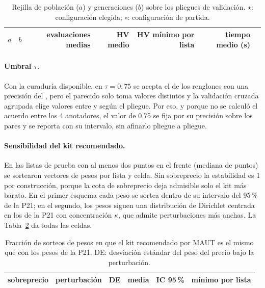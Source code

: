 \begin{table}[htbp]
\centering
\caption{Rejilla de población ($a$) y generaciones ($b$) sobre los pliegues de validación.
$\star$: configuración elegida; $\circ$: configuración de partida.}
\label{tab:calopt-rejilla}
\small
\begin{tabular}{rrrrrrc}
\toprule
$a$ & $b$ & evaluaciones medias & HV medio & HV mínimo por lista & tiempo medio (s) & \\
\midrule

\end{tabular}
\end{table}

\paragraph{Umbral $\tau$.} Con la curaduría disponible, en $\tau=0{,}75$ se acepta el
\calTauAceptada{} de los renglones con una precisión del \calTauPrecision, pero el parecido solo toma
\calTauValores{} valores distintos y la validación cruzada agrupada elige valores entre
\calTauCVMin{} y \calTauCVMax{} según el pliegue. Por eso, y porque no se calculó el acuerdo entre los 4 anotadores, el valor de 0,75 se fija por su
precisión sobre los \calTauPares{} pares y se reporta con su intervalo, sin afinarlo pliegue a pliegue.

\paragraph{Sensibilidad del kit recomendado.} En las \calSensListas{} listas de prueba con al menos
dos puntos en el frente (mediana de \calSensFrenteMediana{} puntos) se sortearon
\calSensPerturbaciones{} vectores de pesos por lista y celda. Sin sobreprecio la estabilidad es 1 por
construcción, porque la cota de sobreprecio deja admisible solo el kit más barato. En el primer
esquema cada peso se sortea dentro de su intervalo del 95\,\% de la P21; en el segundo, los pesos
siguen una distribución de Dirichlet centrada en los de la P21 con concentración $\kappa$, que admite
perturbaciones más anchas. La Tabla~\ref{tab:calopt-sensibilidad} da todas las celdas.

\begin{table}[htbp]
\centering
\caption{Fracción de sorteos de pesos en que el kit recomendado por MAUT es el mismo que con los
pesos de la P21. DE: desviación estándar del peso del precio bajo la perturbación.}
\label{tab:calopt-sensibilidad}
\small
\begin{tabular}{rlrrlr}
\toprule
sobreprecio & perturbación & DE & media & IC 95\,\% & mínimo por lista \\
\midrule

\end{tabular}
\end{table}

